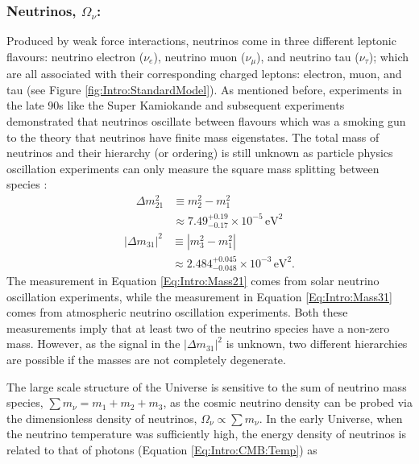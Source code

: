 \subsubsection{Neutrinos, $\Omega_{\nu}$:}
Produced by weak force interactions, neutrinos come in three different leptonic flavours: neutrino electron ($\nu_e$), neutrino muon ($\nu_{\mu}$), and neutrino tau ($\nu_{\tau}$); which are all associated with their corresponding charged leptons: electron, muon, and tau (see Figure \ref{fig:Intro:StandardModel}). As mentioned before, experiments in the late 90s like the Super Kamiokande \citep{Kamiokande1998} and subsequent experiments \citep{2002SNO,2005KamLAND,2008MINOS,2012RENOExperiment,AbeNeutrino2014} demonstrated that neutrinos oscillate between flavours which was a smoking gun to the theory that neutrinos have finite mass eigenstates. The total mass of neutrinos and their hierarchy (or ordering) is still unknown as particle physics oscillation experiments can only measure the square mass splitting between species \citep{2014Gonzalez-GarciaNeutrino}:
\begin{align}
\Delta m_{21}^2 & \equiv m_2^2 - m_1^2 \nonumber \\ 
				& \approx 7.49^{+0.19}_{-0.17} \times 10^{-5}\, \text{eV}^2 \label{Eq:Intro:Mass21}
\end{align}
\begin{align}
|\Delta m_{31}|^2 & \equiv |m^2_3 - m_1^2| \nonumber \\ 
				  & \approx 2.484^{+0.045}_{-0.048} \times 10^{-3} \, \text{eV}^2. \label{Eq:Intro:Mass31}
\end{align}
The measurement in Equation \eqref{Eq:Intro:Mass21} comes from solar neutrino oscillation experiments, while the measurement in Equation \eqref{Eq:Intro:Mass31} comes from atmospheric neutrino oscillation experiments. Both these measurements imply that at least two of the neutrino species have a non-zero mass. However, as the signal in the $|\Delta m_{31}|^2$ is unknown, two different hierarchies are possible if the masses are not completely degenerate.

\qquad The large scale structure of the Universe is sensitive to the sum of neutrino mass species, $\sum m_{\nu} = m_1 + m_2 + m_3$, as the cosmic neutrino density can be probed via the dimensionless density of neutrinos, $\Omega_{\nu} \propto \sum m_{\nu}$. In the early Universe, when the neutrino temperature was sufficiently high, the energy density of neutrinos is related to that of photons (Equation \ref{Eq:Intro:CMB:Temp}) as %

